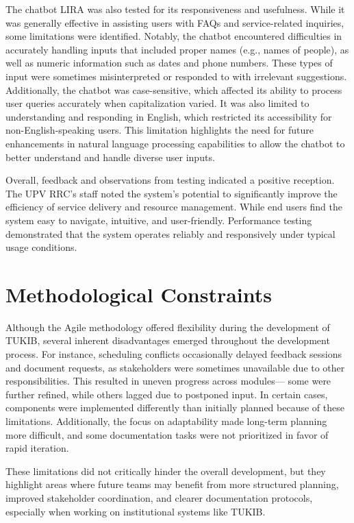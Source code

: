 The chatbot LIRA was also tested for its responsiveness and usefulness. While it was generally effective in assisting users with FAQs and service-related inquiries, some limitations were identified. Notably, the chatbot encountered difficulties in accurately handling inputs that included proper names (e.g., names of people), as well as numeric information such as dates and phone numbers. These types of input were sometimes misinterpreted or responded to with irrelevant suggestions. Additionally, the chatbot was case-sensitive, which affected its ability to process user queries accurately when capitalization varied. It was also limited to understanding and responding in English, which restricted its accessibility for non-English-speaking users. This limitation highlights the need for future enhancements in natural language processing capabilities to allow the chatbot to better understand and handle diverse user inputs.

Overall, feedback and observations from testing indicated a positive reception. The UPV RRC's staff noted the system’s potential to significantly improve the efficiency of service delivery and resource management. While end users find the system easy to navigate, intuitive, and user-friendly. Performance testing demonstrated that the system operates reliably and responsively under typical usage conditions.

\section{Methodological Constraints}

Although the Agile methodology offered flexibility during the development of TUKIB, several inherent disadvantages emerged throughout the development process. For instance, scheduling conflicts occasionally delayed feedback sessions and document requests, as stakeholders were sometimes unavailable due to other responsibilities. This resulted in uneven progress across modules— some were further refined, while others lagged due to postponed input. In certain cases, components were implemented differently than initially planned because of these limitations. Additionally, the focus on adaptability made long-term planning more difficult, and some documentation tasks were not prioritized in favor of rapid iteration.

These limitations did not critically hinder the overall development, but they highlight areas where future teams may benefit from more structured planning, improved stakeholder coordination, and clearer documentation protocols, especially when working on institutional systems like TUKIB.

